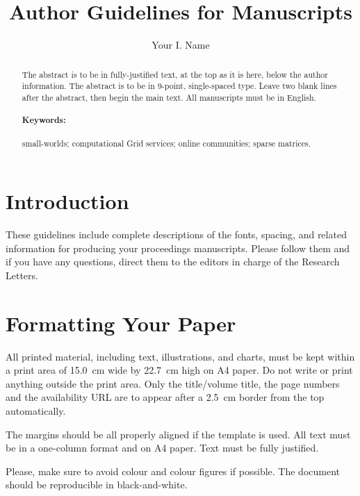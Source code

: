 \documentclass[a4paper,twoside]{arlims}
\title{Author Guidelines for Manuscripts}
\author{Your I. Name}
\institute{
\begin{minipage}[t]{.45\textwidth}\centering
Institute of Information\\
\& Mathematical Sciences\\
Massey University at Albany,\\
Auckland, New Zealand\\
\textnormal{\texttt{\small\{Y.I.Name | A.Othername\}@massey.ac.nz}}
\end{minipage}}
\begin{document}
\maketitle

\begin{abstract}
  The abstract is to be in fully-justified text, at the top as it is
  here, below the author information.  The abstract is to be in
  9-point, single-spaced type. Leave two blank lines after the
  abstract, then begin the main text. All manuscripts must be in
  English.
  
  \paragraph{Keywords:} small-worlds; computational Grid services; online
  communities; sparse matrices.
\end{abstract}

\section{Introduction}
\label{sect:Introduction}

These guidelines include complete descriptions of the fonts, spacing,
and related information for producing your proceedings manuscripts.
Please follow them and if you have any questions, direct them to the
editors in charge of the Research Letters.

\section{Formatting Your Paper}
\label{sect:Formatting}

All printed material, including text, illustrations, and charts, must
be kept within a print area of 15.0~cm wide by 22.7~cm high on A4
paper. Do not write or print anything outside the print area. Only the
title/volume title, the page numbers and the availability URL are to
appear after a 2.5~cm border from the top automatically.

The margins should be all properly aligned if the template is used.
All text must be in a one-column format and on A4 paper. Text must be
fully justified.

Please, make sure to avoid colour and colour figures if possible. The
document should be reproducible in black-and-white.
\end{document}
